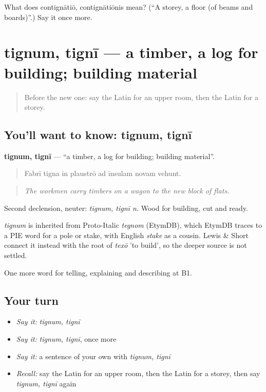 \begin{tcolorbox}[breakable,colback=teal!4,colframe=teal!35!black,title={Before you move on}]
What does contignātiō, contignātiōnis mean? (\textquotedblleft{}A storey, a floor (of beams and boards)\textquotedblright{}.) Say it once more.
\end{tcolorbox}
\section[tignum, tignī]{tignum, tignī — a timber, a log for building; building material}

\label{lesson:LA-C457-tignum}



\begin{quote}
Before the new one: say the Latin for an upper room, then the Latin for a storey.
\end{quote}

\subsection*{You'll want to know: tignum, tignī}
\textbf{tignum, tignī} — \textquotedblleft{}a timber, a log for building; building material\textquotedblright{}.

\begin{quote}
Fabrī tigna in plaustrō ad īnsulam novam vehunt.
\end{quote}

\begin{quote}
\emph{The workmen carry timbers on a wagon to the new block of flats.}
\end{quote}

Second declension, neuter: \emph{tignum, tignī n.} Wood for building, cut and ready.

\begin{cousinweb}
\emph{tignum} is inherited from Proto-Italic \emph{tegnom} (EtymDB), which EtymDB traces to a PIE word for a pole or stake, with English \emph{stake} as a cousin. Lewis \& Short connect it instead with the root of \emph{texō} 'to build', so the deeper source is not settled.
\end{cousinweb}

\begin{grammarlens}[title={What you've built}]
One more word for telling, explaining and describing at B1.
\end{grammarlens}

\subsection*{Your turn}
\begin{itemize}
\raggedright
  \item \emph{Say it:} \emph{tignum, tignī}
  \item \emph{Say it:} \emph{tignum, tignī}, once more
  \item \emph{Say it:} a sentence of your own with \emph{tignum, tignī}
  \item \emph{Recall:} say the Latin for an upper room, then the Latin for a storey, then say \emph{tignum, tignī} again
\end{itemize}

